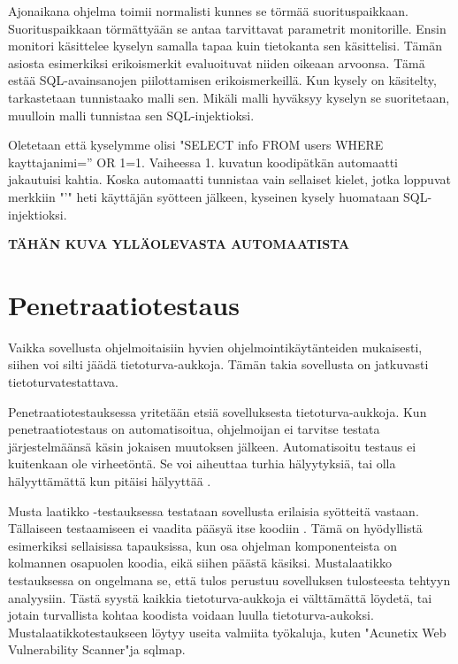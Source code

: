 \documentclass[finnish]{tktltiki2}
\theoremstyle{definition}
\theoremstyle{remark}
\begin{document}
\begin{enumerate}
		Ajonaikana ohjelma toimii normalisti kunnes se törmää suorituspaikkaan. Suorituspaikkaan törmättyään se antaa tarvittavat parametrit monitorille. Ensin monitori käsittelee kyselyn samalla tapaa kuin tietokanta sen käsittelisi. Tämän asiosta esimerkiksi erikoismerkit evaluoituvat niiden oikeaan arvoonsa. Tämä estää SQL-avainsanojen piilottamisen erikoismerkeillä. Kun kysely on käsitelty, tarkastetaan tunnistaako malli sen. Mikäli malli hyväksyy kyselyn se suoritetaan, muulloin malli tunnistaa sen SQL-injektioksi.
		
		Oletetaan että kyselymme olisi "SELECT info FROM users WHERE kayttajanimi='' OR 1=1. Vaiheessa 1. kuvatun koodipätkän automaatti jakautuisi kahtia. Koska automaatti tunnistaa vain sellaiset kielet, jotka loppuvat merkkiin "'" heti käyttäjän syötteen jälkeen, kyseinen kysely huomataan SQL-injektioksi.
		
		\textbf{TÄHÄN KUVA YLLÄOLEVASTA AUTOMAATISTA}
	\end{enumerate}
	
	\section{Penetraatiotestaus}
	
	 Vaikka sovellusta ohjelmoitaisiin hyvien ohjelmointikäytänteiden mukaisesti, siihen voi silti jäädä tietoturva-aukkoja. Tämän takia sovellusta on jatkuvasti tietoturvatestattava. 
	 
	 Penetraatiotestauksessa yritetään etsiä sovelluksesta tietoturva-aukkoja. Kun penetraatiotestaus on automatisoitua, ohjelmoijan ei tarvitse testata järjestelmäänsä käsin jokaisen muutoksen jälkeen. Automatisoitu testaus ei kuitenkaan ole virheetöntä. Se voi aiheuttaa turhia hälyytyksiä, tai olla hälyyttämättä kun pitäisi hälyyttää \cite{virheita}. 
	 
	Musta laatikko -testauksessa testataan sovellusta erilaisia syötteitä vastaan. Tällaiseen testaamiseen ei vaadita pääsyä itse koodiin \cite{testing2}. Tämä on hyödyllistä esimerkiksi sellaisissa tapauksissa, kun osa ohjelman komponenteista on kolmannen osapuolen koodia, eikä siihen päästä käsiksi. Mustalaatikko testauksessa on ongelmana se, että tulos perustuu sovelluksen tulosteesta tehtyyn analyysiin. Tästä syystä kaikkia tietoturva-aukkoja ei välttämättä löydetä, tai jotain turvallista kohtaa koodista voidaan luulla tietoturva-aukoksi. Mustalaatikkotestaukseen löytyy useita valmiita työkaluja, kuten "Acunetix Web Vulnerability Scanner"\space ja sqlmap.
	
\end{document}
